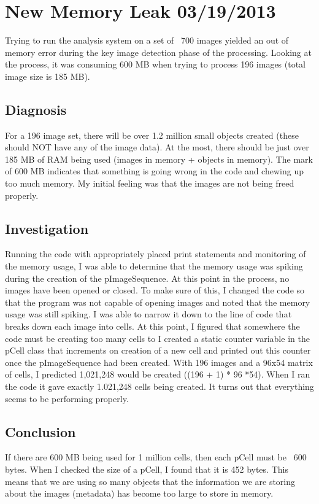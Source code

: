\documentclass[]{article}
\begin{document}
	\section{New Memory Leak 03/19/2013}
		Trying to run the analysis system on a set of ~700 images yielded an out of memory error during the key image detection phase of the processing. Looking at the process, it was consuming 600 MB when trying to process 196 images (total image size is 185 MB). 
		
		\subsection{Diagnosis}
			For a 196 image set, there will be over 1.2 million small objects created (these should NOT have any of the image data). At the most, there should be just over 185 MB of RAM being used (images in memory + objects in memory). The mark of 600 MB indicates that something is going wrong in the code and chewing up too much memory. My initial feeling was that the images are not being freed properly.
			
		\subsection{Investigation}
			Running the code with appropriately placed print statements and monitoring of the memory usage, I was able to determine that the memory usage was spiking during the creation of the pImageSequence. At this point in the process, no images have been opened or closed. To make sure of this, I changed the code so that the program was not capable of opening images and noted that the memory usage was still spiking. I was able to narrow it down to the line of code that breaks down each image into cells. At this point, I figured that somewhere the code must be creating too many cells to I created a static counter variable in the pCell class that increments on creation of a new cell and printed out this counter once the pImageSequence had been created. With 196 images and a 96x54 matrix of cells, I predicted 1,021,248 would be created ((196 + 1) * 96 *54). When I ran the code it gave exactly 1.021,248 cells being created. It turns out that everything seems to be performing properly.
			
		\subsection{Conclusion}
			If there are 600 MB being used for 1 million cells, then each pCell must be ~600 bytes. When I checked the size of a pCell, I found that it is 452 bytes. This means that we are using so many objects that the information we are storing about the images (metadata) has become too large to store in memory. 
			
\end{document}

